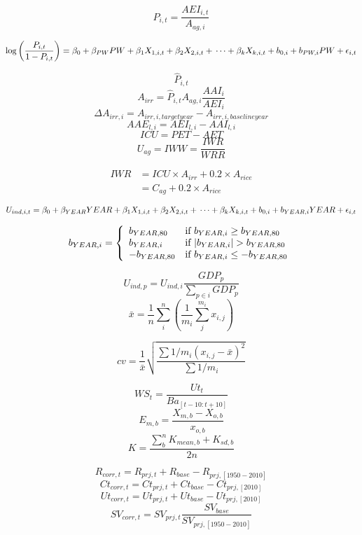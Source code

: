 \documentclass{article}
\begin{document}
\[ P_{i,t} = \frac{AEI_{i,t}}{A_{ag,i}} \]

\[ 
\log \left( \frac{P_{i,t}}{1-P_{i,t}} \right) = \beta_0 + \beta_{PW}PW + \beta_1X_{1,i,t} + \beta_2X_{2,i,t} + \\
\dots + \beta_kX_{k,i,t} + b_{0,i} + b_{PW,i}PW + \epsilon_{i,t}
\]

\[ \hat{P}_{i,t} \]
\[ A_{irr} = \hat{P}_{i,t}A_{ag,i}\frac{AAI_i}{AEI_i} \]
\[ \Delta A_{irr,i} = A_{irr,i,targetyear} - A_{irr,i,baselineyear} \]
\[ AAE_{l,i} = AEI_{l,i} - AAI_{l,i} \]
\[ ICU = PET - AET \]
\[ U_{ag} = IWW = \frac{IWR}{WRR} \]

\begin{align*}
IWR & = ICU\times A_{irr} + 0.2\times A_{rice} \\ 
& = C_{ag} + 0.2\times A_{rice}
\end{align*}

\[
U_{ind,i,t} = \beta_0 + \beta_{YEAR}YEAR + \beta_1X_{1,i,t} + \beta_2X_{2,i,t} + \\ \dots + \beta_kX_{k,i,t} + b_{0,i} + b_{YEAR,i}YEAR + \epsilon_{i,t} 
\]

\[
b_{YEAR,i} = \left\{
\begin{array}{l l}
b_{YEAR,80} & \text{if } b_{YEAR,i} \geq b_{YEAR,80} \\
b_{YEAR,i} & \text{if } |b_{YEAR,i}| > b_{YEAR,80} \\
-b_{YEAR,80} & \text{if } b_{YEAR,i} \leq -b_{YEAR,80} 
\end{array} \right.
\]

\[ U_{ind,p} = U_{ind,i} \frac{GDP_p}{\sum_{p\in i}GDP_p} \]
\[ \bar{x} = \frac{1}{n}\sum_i^n \left( \frac{1}{m_i} \sum_j^{m_i} x_{i,j} \right) \]

\[ cv = \frac{1}{\bar{x}}\sqrt{\frac{\sum 1/m_i(x_{i,j}-\bar{x})^2}{\sum 1/m_i}} \]

\[ WS_t = \frac{Ut_t}{Ba_{[t-10:t+10]}} \]
\[ E_{m,b} = \frac{X_{m,b}-X_{o,b}}{x_{o,b}} \]
\[ K = \frac{\sum_b^n K_{mean,b} + K_{sd,b}}{2n} \]

\[ R_{corr,t} = R_{prj,t} + R_{base} - R_{prj,[1950-2010]} \]
\[ Ct_{corr,t} = Ct_{prj,t} + Ct_{base} - Ct_{prj,[2010]} \]
\[ Ut_{corr,t} = Ut_{prj,t} + Ut_{base} - Ut_{prj,[2010]} \]
\[ SV_{corr,t} = SV_{prj,t}\frac{SV_{base}}{SV_{prj,[1950-2010]}} \]
\end{document}
